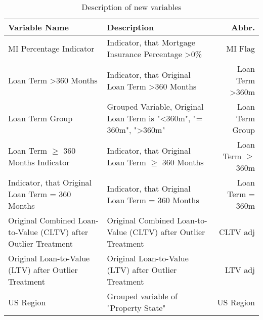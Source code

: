 \begin{table}[H]
\centering
\begin{tabular}{ Lp{8cm}R } \toprule
\textbf{Variable Name}  & \textbf{Description}                                                                                                                                                                                                                                                          & \textbf{Abbr.}       \\\midrule
MI Percentage Indicator                                        & Indicator, that Mortgage Insurance Percentage \textgreater 0\%                           & MI Flag                     \\\hline
Loan Term \textgreater 360 Months                              & Indicator, that Original Loan Term \textgreater 360 Months                               & Loan Term \textgreater 360m \\\hline
Loan Term Group                                                & Grouped Variable, Original Loan Term is "\textless 360m", "= 360m", "\textgreater{}360m" & Loan Term Group             \\\hline
Loan Term $\geq$ 360 Months Indicator                          & Indicator, that Original Loan Term $\geq$ 360 Months                                     & Loan Term $\geq$ 360m        \\\hline
Indicator, that Original Loan Term = 360 Months                & Indicator, that Original Loan Term = 360 Months                                          & Loan Term = 360m            \\\hline
Original Combined Loan-to-Value (CLTV) after Outlier Treatment & Original Combined Loan-to-Value (CLTV) after Outlier Treatment                           & CLTV adj                    \\\hline
Original Loan-to-Value (LTV) after Outlier Treatment           & Original Loan-to-Value (LTV) after Outlier Treatment                                     & LTV adj                     \\\hline
US Region                                                      & Grouped variable of "Property State"                                                     & US Region                \\\bottomrule
\end{tabular}%
\caption{Description of new variables}
\label{tab:re_descr_newvar}
\end{table}

